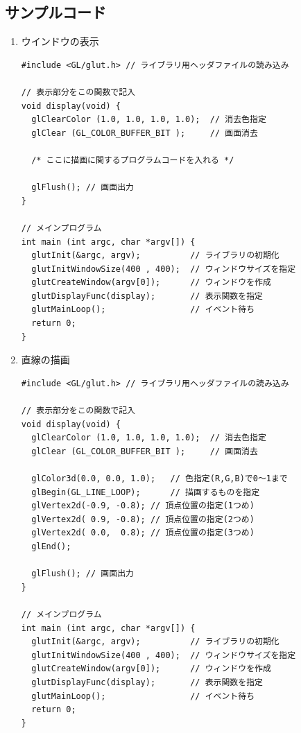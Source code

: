 \documentclass{scrartcl}
\begin{document}
\subsection{サンプルコード}
\label{sec:org4008bbf}
\begin{enumerate}
\item ウインドウの表示\\

\begin{verbatim}
#include <GL/glut.h> // ライブラリ用ヘッダファイルの読み込み

// 表示部分をこの関数で記入
void display(void) {        
  glClearColor (1.0, 1.0, 1.0, 1.0);  // 消去色指定
  glClear (GL_COLOR_BUFFER_BIT );     // 画面消去

  /* ここに描画に関するプログラムコードを入れる */

  glFlush(); // 画面出力
}

// メインプログラム
int main (int argc, char *argv[]) { 
  glutInit(&argc, argv);          // ライブラリの初期化
  glutInitWindowSize(400 , 400);  // ウィンドウサイズを指定
  glutCreateWindow(argv[0]);      // ウィンドウを作成
  glutDisplayFunc(display);       // 表示関数を指定
  glutMainLoop();                 // イベント待ち
  return 0;
}

\end{verbatim}

\item 直線の描画\\

\begin{verbatim}
#include <GL/glut.h> // ライブラリ用ヘッダファイルの読み込み

// 表示部分をこの関数で記入
void display(void) {        
  glClearColor (1.0, 1.0, 1.0, 1.0);  // 消去色指定
  glClear (GL_COLOR_BUFFER_BIT );     // 画面消去

  glColor3d(0.0, 0.0, 1.0);   // 色指定(R,G,B)で0～1まで
  glBegin(GL_LINE_LOOP);      // 描画するものを指定
  glVertex2d(-0.9, -0.8); // 頂点位置の指定(1つめ)
  glVertex2d( 0.9, -0.8); // 頂点位置の指定(2つめ)
  glVertex2d( 0.0,  0.8); // 頂点位置の指定(3つめ) 
  glEnd();                               

  glFlush(); // 画面出力
}

// メインプログラム
int main (int argc, char *argv[]) { 
  glutInit(&argc, argv);          // ライブラリの初期化
  glutInitWindowSize(400 , 400);  // ウィンドウサイズを指定
  glutCreateWindow(argv[0]);      // ウィンドウを作成
  glutDisplayFunc(display);       // 表示関数を指定
  glutMainLoop();                 // イベント待ち
  return 0;
}
\end{verbatim}


\end{enumerate}
\end{document}
